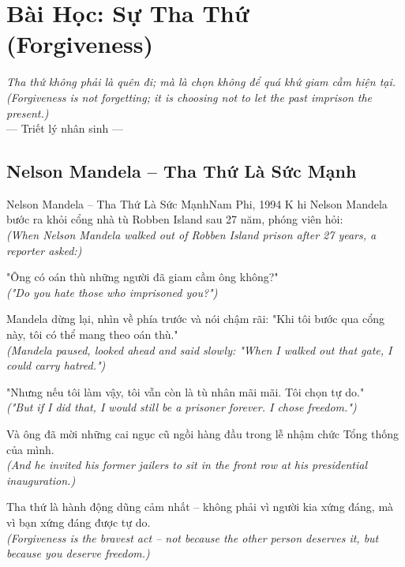 \chapter{Bài Học: Sự Tha Thứ (Forgiveness)}
\begin{center}
  \textit{\color{truyenblue}Tha thứ không phải là quên đi; mà là chọn không để quá khứ giam cầm hiện tại.}\\
  \textit{(Forgiveness is not forgetting; it is choosing not to let the past imprison the present.)}\\[4pt]
  \small\color{truyengold}--- Triết lý nhân sinh ---
\end{center}
\ngancach

\section{Nelson Mandela -- Tha Thứ Là Sức Mạnh}
\begin{truyen}{Nelson Mandela -- Tha Thứ Là Sức Mạnh}{Nam Phi, 1994}
K hi Nelson Mandela bước ra khỏi cổng nhà tù Robben Island sau 27 năm, phóng viên hỏi:\\
\textit{(When Nelson Mandela walked out of Robben Island prison after 27 years, a reporter asked:)}

"Ông có oán thù những người đã giam cầm ông không?"\\
\textit{("Do you hate those who imprisoned you?")}

Mandela dừng lại, nhìn về phía trước và nói chậm rãi: "Khi tôi bước qua cổng này, tôi có thể mang theo oán thù."\\
\textit{(Mandela paused, looked ahead and said slowly: "When I walked out that gate, I could carry hatred.")}

"Nhưng nếu tôi làm vậy, tôi vẫn còn là tù nhân mãi mãi. Tôi chọn tự do."\\
\textit{("But if I did that, I would still be a prisoner forever. I chose freedom.")}

Và ông đã mời những cai ngục cũ ngồi hàng đầu trong lễ nhậm chức Tổng thống của mình.\\
\textit{(And he invited his former jailers to sit in the front row at his presidential inauguration.)}

\end{truyen}
\begin{baihoc}
  Tha thứ là hành động dũng cảm nhất -- không phải vì người kia xứng đáng, mà vì bạn xứng đáng được tự do.\\
  \textit{(Forgiveness is the bravest act -- not because the other person deserves it, but because you deserve freedom.)}
\end{baihoc}

